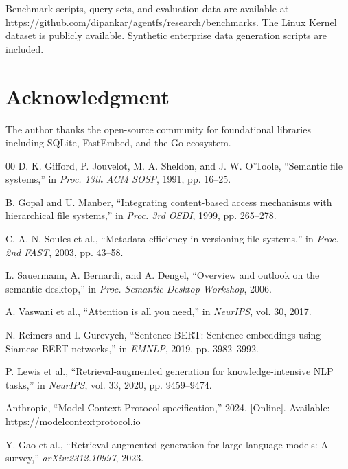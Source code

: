 \documentclass[conference]{IEEEtran}
\begin{document}
Benchmark scripts, query sets, and evaluation data are available at \url{https://github.com/dipankar/agentfs/research/benchmarks}. The Linux Kernel dataset is publicly available. Synthetic enterprise data generation scripts are included.

\section*{Acknowledgment}

The author thanks the open-source community for foundational libraries including SQLite, FastEmbed, and the Go ecosystem.

\begin{thebibliography}{00}
 D. K. Gifford, P. Jouvelot, M. A. Sheldon, and J. W. O'Toole, ``Semantic file systems,'' in \textit{Proc. 13th ACM SOSP}, 1991, pp. 16--25.

 B. Gopal and U. Manber, ``Integrating content-based access mechanisms with hierarchical file systems,'' in \textit{Proc. 3rd OSDI}, 1999, pp. 265--278.

 C. A. N. Soules et al., ``Metadata efficiency in versioning file systems,'' in \textit{Proc. 2nd FAST}, 2003, pp. 43--58.

 L. Sauermann, A. Bernardi, and A. Dengel, ``Overview and outlook on the semantic desktop,'' in \textit{Proc. Semantic Desktop Workshop}, 2006.

 A. Vaswani et al., ``Attention is all you need,'' in \textit{NeurIPS}, vol. 30, 2017.

 N. Reimers and I. Gurevych, ``Sentence-BERT: Sentence embeddings using Siamese BERT-networks,'' in \textit{EMNLP}, 2019, pp. 3982--3992.

 P. Lewis et al., ``Retrieval-augmented generation for knowledge-intensive NLP tasks,'' in \textit{NeurIPS}, vol. 33, 2020, pp. 9459--9474.

 Anthropic, ``Model Context Protocol specification,'' 2024. [Online]. Available: https://modelcontextprotocol.io

 Y. Gao et al., ``Retrieval-augmented generation for large language models: A survey,'' \textit{arXiv:2312.10997}, 2023.
\end{thebibliography}
\end{document}
